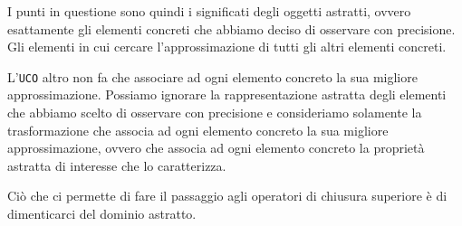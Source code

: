 I punti in questione sono quindi i significati degli oggetti astratti, ovvero esattamente gli
elementi concreti che
abbiamo deciso di osservare con precisione. Gli elementi in cui cercare l'approssimazione di tutti 
gli altri elementi concreti.
\begin{tcolorbox}
    L'\texttt{UCO} altro non fa che associare ad ogni elemento concreto la sua migliore 
    approssimazione. Possiamo ignorare la rappresentazione astratta degli elementi 
    che abbiamo scelto di osservare con precisione e consideriamo solamente 
    la trasformazione che associa ad ogni elemento concreto la sua migliore approssimazione,
    ovvero che associa ad ogni elemento concreto la proprietà astratta di interesse che lo 
    caratterizza.
\end{tcolorbox}
Ciò che ci permette di fare il passaggio agli operatori di chiusura superiore è di 
dimenticarci del dominio astratto.
\begin{figure}[H]
    \centering
\end{figure}
